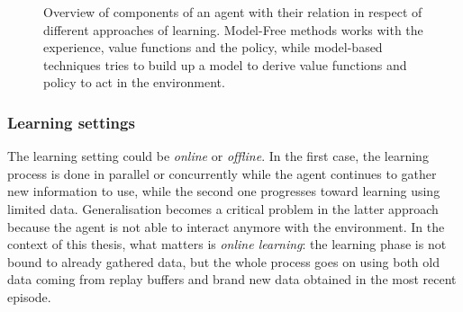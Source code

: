\begin{figure}
	\centering
	\caption[Overview of different components in reinforcement learning]{ Overview of components of an agent with their relation in respect of different approaches of learning. Model-Free methods works with the experience, value functions and the policy, while model-based techniques tries to build up a model to derive value functions and policy to act in the environment.}
	\label{fig:components}
\end{figure}

\subsubsection{Learning settings}

The learning setting could be \textit{online} or \textit{offline}. In the first case, the learning process is done in parallel or concurrently while the agent continues to gather new information to use, while the second one progresses toward learning using limited data.
Generalisation becomes a critical problem in the latter approach because the agent is not able to interact anymore with the environment.
In the context of this thesis, what matters is \textit{online learning}: the learning phase is not bound to already gathered data, but the whole process goes on using both old data coming from replay buffers and brand new data obtained in the most recent episode.

